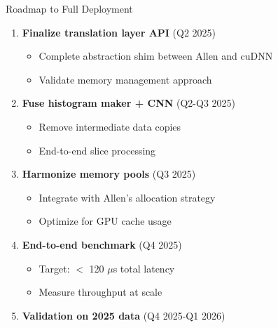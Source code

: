 \documentclass[10pt,aspectratio=169]{beamer}
\begin{document}
\begin{frame}{Roadmap to Full Deployment}
  \begin{enumerate}
    \item \textbf{Finalize translation layer API} (Q2 2025)
      \begin{itemize}
        \item Complete abstraction shim between Allen and cuDNN
        \item Validate memory management approach
      \end{itemize}
    \item \textbf{Fuse histogram maker + CNN} (Q2-Q3 2025)
      \begin{itemize}
        \item Remove intermediate data copies
        \item End-to-end slice processing
      \end{itemize}
    \item \textbf{Harmonize memory pools} (Q3 2025)
      \begin{itemize}
        \item Integrate with Allen's allocation strategy
        \item Optimize for GPU cache usage
      \end{itemize}
    \item \textbf{End-to-end benchmark} (Q4 2025)
      \begin{itemize}
        \item Target: $<$ 120 $\mu$s total latency
        \item Measure throughput at scale
      \end{itemize}
    \item \textbf{Validation on 2025 data} (Q4 2025-Q1 2026)
  \end{enumerate}
\end{frame}
\end{document}
